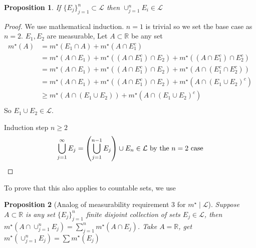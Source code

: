 \documentclass[11pt]{article}
\newtheorem*{prop}{Proposition}
\newcommand{\mstar}[1]{m^{\star}\left(#1\right)}
\begin{document}
    \begin{prop}
        If $\{ E_j \}_{j=1}^{n} \subset \mathcal{L}$ then $\cup_{j=1}^{n} E_i \in \mathcal{L}$
    \end{prop}
    
    \begin{proof}
        We use mathematical induction.
        $n=1$ is trivial so we set the base case as $n=2$.
        $E_1, E_2$ are measurable, Let $A \subset \mathbb{R}$ be any set
        \begin{align*}
            \mstar{A} &= \mstar{E_1 \cap A} + \mstar{A \cap E_1 ^{c}} \\
            &= \mstar{A \cap E_1} + \mstar{(A \cap E_1^{c}) \cap E_2} + \mstar{(A \cap E_1 ^{c}) \cap E_2 ^{c}} \\
            &= \mstar{A \cap E_1} + \mstar{(A \cap E_1^{c}) \cap E_2} + \mstar{A \cap (E_1 ^{c} \cap E_2 ^{c})} \\
            &= \mstar{A \cap E_1} + \mstar{(A \cap E_1^{c}) \cap E_2} + \mstar{A \cap (E_1 \cup E_2)^{c}}\\
            &\geq \mstar{A \cap (E_1 \cup E_2)} + \mstar{A \cap (E_1 \cup E_2)^{c}} \tag{3w} \\
        \end{align*}
        So $E_1 \cup E_2 \in \mathcal{L}$.

        Induction step $n \geq 2$
        \[
            \bigcup_{j=1}^{\infty} E_j = \left( \bigcup_{j=1}^{n-1} E_j \right) \cup E_n \in \mathcal{L} \text{ by the $n=2$ case} \qedhere
        \]
    \end{proof}
    
    To prove that this also applies to countable sets, we use
    \begin{prop}[Analog of measurability requirement 3 for $m^{\star} \mid \mathcal{L}$]
        Suppose $A \subset \mathbb{R}$ is any set $\{ E_j \}_{j=1}^{n}$ finite disjoint collection of sets $E_j \in \mathcal{L}$, then $\mstar{A \cap \cup_{j=1}^{n} E_j} = \sum_{j=1}^{n} \mstar{A \cap E_j}$.
        Take $A = \mathbb{R}$, get $\mstar{\cup_{j=1}^{n}E_j} = \sum \mstar{E_j}$
    \end{prop}
\end{document}
